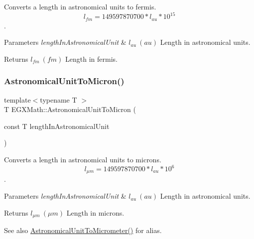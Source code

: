 Converts a length in astronomical units to fermis. \[ l_{fm}=149597870700 * l_{au} * 10^{15} \]. 


\begin{DoxyParams}{Parameters}
{\em length\+In\+Astronomical\+Unit} & $ l_{au}\ (au)$ Length in astronomical units. \\
\hline
\end{DoxyParams}
\begin{DoxyReturn}{Returns}
$ l_{fm}\ (fm)$ Length in fermis. 
\end{DoxyReturn}
\mbox{\label{group___e_g_x_math-_conversions-_length_conversions-_astronomical-_astronomical_unit-_non-_s_i_ga9fd03b0356095288ca7476121e45042d}} 
\subsubsection{\texorpdfstring{Astronomical\+Unit\+To\+Micron()}{AstronomicalUnitToMicron()}}
{\footnotesize\ttfamily template$<$typename T $>$ \\
T E\+G\+X\+Math\+::\+Astronomical\+Unit\+To\+Micron (\begin{DoxyParamCaption}\item[{const T}]{length\+In\+Astronomical\+Unit }\end{DoxyParamCaption})}



Converts a length in astronomical units to microns. \[ l_{\mu m}=149597870700 * l_{au} * 10^{6} \]. 


\begin{DoxyParams}{Parameters}
{\em length\+In\+Astronomical\+Unit} & $ l_{au}\ (au)$ Length in astronomical units. \\
\hline
\end{DoxyParams}
\begin{DoxyReturn}{Returns}
$ l_{\mu m}\ (\mu m)$ Length in microns. 
\end{DoxyReturn}
\begin{DoxySeeAlso}{See also}
\mbox{\hyperlink{group___e_g_x_math-_conversions-_length_conversions-_astronomical-_astronomical_unit-_s_i_ga23b887b2e141dc9686237c124e2245ac}{Astronomical\+Unit\+To\+Micrometer()}} for alias. 
\end{DoxySeeAlso}
\mbox{\label{group___e_g_x_math-_conversions-_length_conversions-_astronomical-_astronomical_unit-_non-_s_i_ga8b3dc85e14d6129ebfa2f6336d63bf9c}} 
